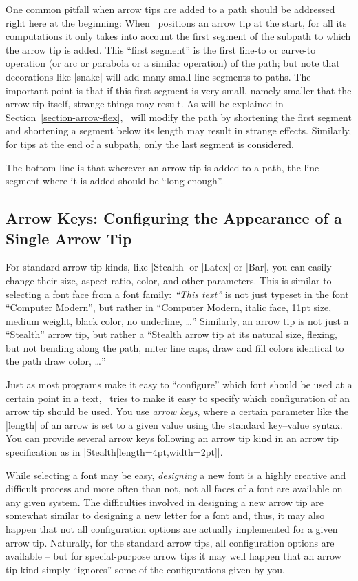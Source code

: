 One common pitfall when arrow tips are added to a path should be addressed
right here at the beginning: When \tikzname\ positions an arrow tip at the
start, for all its computations it only takes into account the first segment of
the subpath to which the arrow tip is added. This ``first segment'' is the
first line-to or curve-to operation (or arc or parabola or a similar operation)
of the path; but note that decorations like |snake| will add many small line
segments to paths. The important point is that if this first segment is very
small, namely smaller that the arrow tip itself, strange things may result. As
will be explained in Section~\ref{section-arrow-flex}, \tikzname\ will modify
the path by shortening the first segment and shortening a segment below its
length may result in strange effects. Similarly, for tips at the end of a
subpath, only the last segment is considered.

The bottom line is that wherever an arrow tip is added to a path, the line
segment where it is added should be ``long enough''.


\subsection{Arrow Keys: Configuring the Appearance of a Single Arrow Tip}
\label{section-arrow-config}

For standard arrow tip kinds, like |Stealth| or |Latex| or |Bar|, you can
easily change their size, aspect ratio, color, and other parameters. This is
similar to selecting a font face from a font family: \emph{``This text''} is
not just typeset in the font ``Computer Modern'', but rather in ``Computer
Modern, italic face, 11pt size, medium weight, black color, no underline,
\dots'' Similarly, an arrow tip is not just a ``Stealth'' arrow tip, but rather
a ``Stealth arrow tip at its natural size, flexing, but not bending along the
path, miter line caps, draw and fill colors identical to the path draw color,
\dots''

Just as most programs make it easy to ``configure'' which font should be used
at a certain point in a text, \tikzname\ tries to make it easy to specify which
configuration of an arrow tip should be used. You use \emph{arrow keys}, where
a certain parameter like the |length| of an arrow is set to a given value using
the standard key--value syntax. You can provide several arrow keys following an
arrow tip kind in  an arrow tip specification as in
|Stealth[length=4pt,width=2pt]|.

While selecting a font may be easy, \emph{designing} a new font is a highly
creative and difficult process and more often than not, not all faces of a font
are available on any given system. The difficulties involved in designing a new
arrow tip are somewhat similar to designing a new letter for a font and, thus,
it may also happen that not all configuration options are actually implemented
for a given arrow tip. Naturally, for the standard arrow tips, all
configuration options are available -- but for special-purpose arrow tips it
may well happen that an arrow tip kind simply ``ignores'' some of the
configurations given by you.


